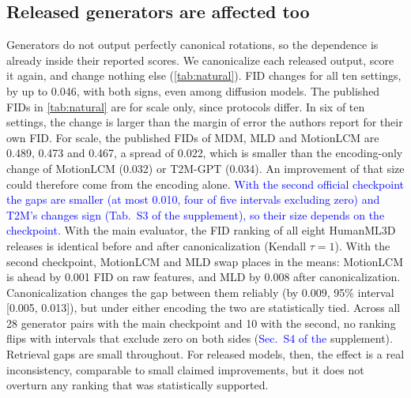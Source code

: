 \documentclass[10pt,twocolumn,letterpaper]{article}
\newcommand{\new}[1]{\textcolor{blue}{#1}}%
\begin{document}
\subsection{Released generators are affected too}
Generators do not output perfectly canonical rotations, so the dependence is already inside their reported scores. We canonicalize each released output, score it again, and change nothing else (\cref{tab:natural}). FID changes for all ten settings, by up to 0.046, with both signs, even among diffusion models. The published FIDs in \cref{tab:natural} are for scale only, since protocols differ. In six of ten settings, the change is larger than the margin of error the authors report for their own FID. For scale, the published FIDs of MDM, MLD and MotionLCM are 0.489, 0.473 and 0.467, a spread of 0.022, which is smaller than the encoding-only change of MotionLCM (0.032) or T2M-GPT (0.034). An improvement of that size could therefore come from the encoding alone. \new{With the second official checkpoint the gaps are smaller (at most 0.010, four of five intervals excluding zero) and T2M's changes sign (Tab.~S3 of the supplement), so their size depends on the checkpoint.} With the main evaluator, the FID ranking of all eight HumanML3D releases is identical before and after canonicalization (Kendall $\tau=1$). With the second checkpoint, MotionLCM and MLD swap places in the means: MotionLCM is ahead by 0.001 FID on raw features, and MLD by 0.008 after canonicalization. Canonicalization changes the gap between them reliably (by 0.009, 95\% interval [0.005, 0.013]), but under either encoding the two are statistically tied. Across all 28 generator pairs with the main checkpoint and 10 with the second, no ranking flips with intervals that exclude zero on both sides (\new{Sec.~S4 of the} supplement). Retrieval gaps are small throughout. For released models, then, the effect is a real inconsistency, comparable to small claimed improvements, but it does not overturn any ranking that was statistically supported.
\end{document}
